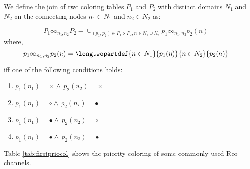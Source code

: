 \begin{definition}
We define the join of two coloring tables $P_1$ and $P_2$ with distinct domains $N_1$ and $N_2$ on the connecting nodes $n_1 \in N_1$ and $n_2 \in N_2$ as:

$$P_1 \infty_{n_1, n_2} P_2 = \cup_{(p_1, p_2) \in P_1 \times P_2, n \in N_1 \cup N_2} p_1 \infty_{n_1, n_2} p_2(n)$$
where,
$$p_1 \infty_{n_1, n_2} p_2(n) = \longtwopartdef{n \in N_1}{p_1(n)}{n \in N_2}{p_2(n)}$$


iff one of the following conditions holds:

\begin{enumerate}
\item $p_1(n_1)=\times \wedge \ p_2(n_2)=\times$
\item $p_1(n_1)=\circ \wedge \ p_2(n_2)=\bullet$
\item $p_1(n_1)=\bullet \wedge \ p_2(n_2)=\circ$
\item $p_1(n_1)=\bullet \wedge \ p_2(n_2)=\bullet$
\end{enumerate}
\label{def:priojoinoperator}
\end{definition}

Table \ref{tab:firstpriocol} shows  the priority coloring of some commonly used Reo channels.

